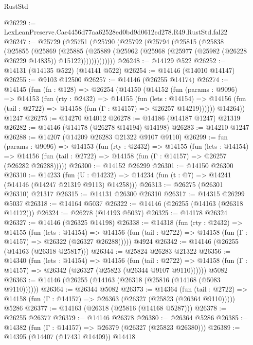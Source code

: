 \begin{lexlean}{RustStd}
\begin{coremodule}
@26229 := LexLeanPreserve.Cae4456d77aa62528ed0bd9d0612cd278.R49.RustStd.fal22
@26247 := @25729
    (@25751
      (@25790
        (@25792
          (@25794
            (@25815
              (@25838
                (@25855
                  (@25869
                    (@25885
                      (@25889
                        (@25962 (@25968 (@25977 (@25982 (@26228 @26229 @14835)) @15122)))))))))))))
@26248 := @14129 @522
@26252 := @14131 (@14135 @522) (@14141 @522)
@26254 := @14146 (@14010 @14147)
@26255 := @9103 @12500
@26257 := @14146 (@26255 @14174)
@26274 := @14145
    (fun (fn : @128) =>
    @26254
      (@14150
        (@14152
          (fun (params : @9096) =>
          @14153
            (fun (rty : @2432) =>
            @14155
              (fun (lets : @14154) =>
              @14156 (fun (tail : @2722) => @14158 (fun (Γ : @14157) => @26257 @14219))))))
        @14264))
    @1247
@26275 := @14270 @14012
@26278 := @14186 (@14187 @1247) @21319
@26282 := @14146 (@14178 (@26278 @14194) @14198)
@26283 := @14210 @1247
@26288 := @14207 (@14209 @26283 @21322 @9107 @9110)
@26299 := fun (params : @9096) =>
  @14153
    (fun (rty : @2432) =>
    @14155
      (fun (lets : @14154) =>
      @14156 (fun (tail : @2722) => @14158 (fun (Γ : @14157) => @26257 (@26282 @26288)))))
@26300 := @14152 @26299
@26301 := @14150 @26300
@26310 := @14233
    (fun (U : @14232) => @14234 (fun (t : @7) => @14241 (@14146 (@14247 @21319 @9113) @14258)))
@26313 := @26275 (@26301 @26310) @21317
@26315 := @14131 @26300 @26310
@26317 := @14315 @26299 @5037
@26318 := @14164 @5037
@26322 := @14146 (@26255 (@14163 (@26318 @14172)))
@26324 := @26278 (@14193 @5037)
@26325 := @14178 @26324
@26327 := @14146 (@26325 @14198)
@26338 := @14318
    (fun (rty : @2432) =>
    @14155
      (fun (lets : @14154) =>
      @14156 (fun (tail : @2722) => @14158 (fun (Γ : @14157) => @26322 (@26327 @26288)))))
    @4924
@26342 := @14146 (@26255 (@14163 (@26318 @25817)))
@26344 := @25824 @26283 @21322
@26356 := @14340
    (fun (lets : @14154) =>
    @14156
      (fun (tail : @2722) =>
      @14158 (fun (Γ : @14157) => @26342 (@26327 (@25823 (@26344 @9107 @9110))))))
    @5082
@26363 := @14146 (@26255 (@14163 (@26318 (@25816 (@14168 (@5083 @9110))))))
@26364 := @26344 @5082
@26373 := @14364
    (fun (tail : @2722) => @14158 (fun (Γ : @14157) => @26363 (@26327 (@25823 (@26364 @9110)))))
    @5286
@26377 := @14163 (@26318 (@25816 (@14168 @5287)))
@26378 := @26255 @26377
@26379 := @14146 @26378
@26380 := @26364 @5286
@26385 := @14382 (fun (Γ : @14157) => @26379 (@26327 (@25823 @26380)))
@26389 := @14395 (@14407 (@17431 @14409)) @14418

\end{coremodule}
\end{lexlean}

